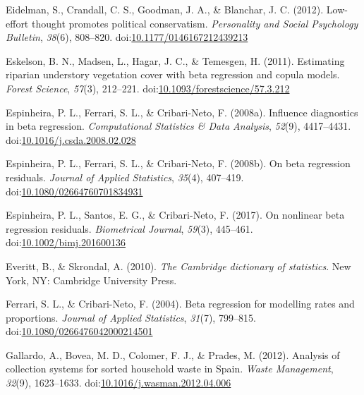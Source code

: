 \documentclass[english,,man]{apa6}
\begin{document}
\leavevmode\hypertarget{ref-eidelman2012low}{}%
Eidelman, S., Crandall, C. S., Goodman, J. A., \& Blanchar, J. C. (2012). Low-effort thought promotes political conservatism. \emph{Personality and Social Psychology Bulletin}, \emph{38}(6), 808--820. doi:\href{https://doi.org/10.1177/0146167212439213}{10.1177/0146167212439213}

\leavevmode\hypertarget{ref-eskelson2011estimating}{}%
Eskelson, B. N., Madsen, L., Hagar, J. C., \& Temesgen, H. (2011). Estimating riparian understory vegetation cover with beta regression and copula models. \emph{Forest Science}, \emph{57}(3), 212--221. doi:\href{https://doi.org/10.1093/forestscience/57.3.212}{10.1093/forestscience/57.3.212}

\leavevmode\hypertarget{ref-espinheira2008influence}{}%
Espinheira, P. L., Ferrari, S. L., \& Cribari-Neto, F. (2008a). Influence diagnostics in beta regression. \emph{Computational Statistics \& Data Analysis}, \emph{52}(9), 4417--4431. doi:\href{https://doi.org/10.1016/j.csda.2008.02.028}{10.1016/j.csda.2008.02.028}

\leavevmode\hypertarget{ref-espinheira2008beta}{}%
Espinheira, P. L., Ferrari, S. L., \& Cribari-Neto, F. (2008b). On beta regression residuals. \emph{Journal of Applied Statistics}, \emph{35}(4), 407--419. doi:\href{https://doi.org/10.1080/02664760701834931}{10.1080/02664760701834931}

\leavevmode\hypertarget{ref-espinheira2017nonlinear}{}%
Espinheira, P. L., Santos, E. G., \& Cribari-Neto, F. (2017). On nonlinear beta regression residuals. \emph{Biometrical Journal}, \emph{59}(3), 445--461. doi:\href{https://doi.org/10.1002/bimj.201600136}{10.1002/bimj.201600136}

\leavevmode\hypertarget{ref-everitt2002cambridge}{}%
Everitt, B., \& Skrondal, A. (2010). \emph{The Cambridge dictionary of statistics}. New York, NY: Cambridge University Press.

\leavevmode\hypertarget{ref-ferrari2004beta}{}%
Ferrari, S. L., \& Cribari-Neto, F. (2004). Beta regression for modelling rates and proportions. \emph{Journal of Applied Statistics}, \emph{31}(7), 799--815. doi:\href{https://doi.org/10.1080/0266476042000214501}{10.1080/0266476042000214501}

\leavevmode\hypertarget{ref-gallardo2012analysis}{}%
Gallardo, A., Bovea, M. D., Colomer, F. J., \& Prades, M. (2012). Analysis of collection systems for sorted household waste in Spain. \emph{Waste Management}, \emph{32}(9), 1623--1633. doi:\href{https://doi.org/10.1016/j.wasman.2012.04.006}{10.1016/j.wasman.2012.04.006}
\end{document}
